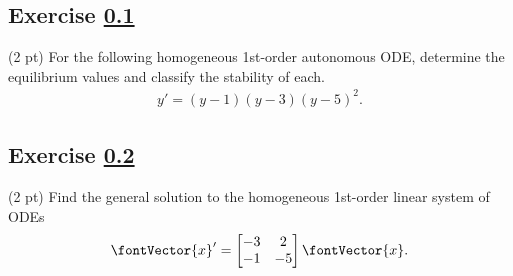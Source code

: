 \subsection{Exercise \ref{sec : Differential Equations Q1}}
\label{sec : Differential Equations Q1}


(2 pt) For the following homogeneous 1st-order autonomous ODE, determine the equilibrium values and classify the stability of each.
\begin{align*}
y'
=
(y - 1) (y - 3) (y - 5)^{2}.
\end{align*}




\subsection{Exercise \ref{sec : Differential Equations Q2}}
\label{sec : Differential Equations Q2}


(2 pt) Find the general solution to the homogeneous 1st-order linear system of ODEs
\begin{align*}
\fontVector{x}'
=
\begin{bmatrix}
-3	&	2	\\
-1	&	-5
\end{bmatrix}
\fontVector{x}.
\end{align*}


